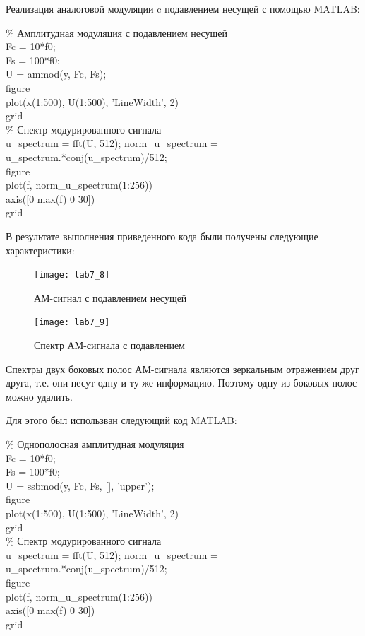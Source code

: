 \documentclass[10pt,a4paper]{article}
\begin{document}
Реализация аналоговой модуляции c подавлением несущей с помощью MATLAB:
\begin{flushleft}

\% Амплитудная модуляция с подавлением несущей\\
Fc = 10*f0;\\
Fs = 100*f0;\\
U = ammod(y, Fc, Fs);\\
figure \\
plot(x(1:500), U(1:500), 'LineWidth', 2)\\
grid\\

\% Спектр модурированного сигнала\\
u\_spectrum = fft(U, 512);
norm\_u\_spectrum = u\_spectrum.*conj(u\_spectrum)/512;\\
figure\\
plot(f, norm\_u\_spectrum(1:256))\\
axis([0 max(f) 0 30])\\
grid\\
\end{flushleft}

В результате выполнения приведенного кода были получены следующие характеристики:

\begin{figure}[h]\centering
  \parbox[b]{0.49\textwidth}{\centering
    \texttt{[image: lab7\_8]} 
    \caption{АМ-сигнал с подавлением несущей}\label{fig.l7_8}}
  \hfil\hfil 
  \begin{minipage}[b]{0.49\textwidth}
	\centering
	\texttt{[image: lab7\_9]}
	\caption{Спектр АМ-сигнала с подавлением}\label{fig.l7_9} 
  \end{minipage}
\end{figure}

\FloatBarrier

Спектры двух боковых полос АМ-сигнала являются зеркальным отражением друг друга, т.е. они несут одну и ту же информацию. Поэтому одну из боковых полос можно удалить.

Для этого был использван следующий код MATLAB:
\begin{flushleft}
\% Однополосная амплитудная модуляция\\
Fc = 10*f0;\\
Fs = 100*f0;\\
U = ssbmod(y, Fc, Fs, [], 'upper');\\
figure \\
plot(x(1:500), U(1:500), 'LineWidth', 2)\\
grid\\

\% Спектр модурированного сигнала\\
u\_spectrum = fft(U, 512);
norm\_u\_spectrum = u\_spectrum.*conj(u\_spectrum)/512;\\
figure\\
plot(f, norm\_u\_spectrum(1:256))\\
axis([0 max(f) 0 30])\\
grid\\
\end{flushleft}
\end{document}
